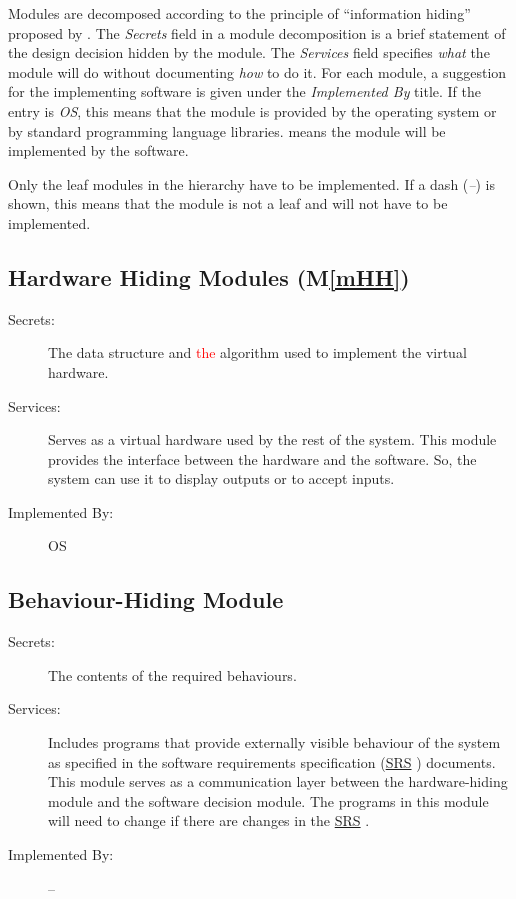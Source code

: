 \documentclass[12pt, titlepage]{article}
\newcommand{\mref}[1]{M\ref{#1}}
\begin{document}
Modules are decomposed according to the principle of ``information hiding''
proposed by \citet{ParnasEtAl1984}. The \emph{Secrets} field in a module
decomposition is a brief statement of the design decision hidden by the
module. The \emph{Services} field specifies \emph{what} the module will do
without documenting \emph{how} to do it. For each module, a suggestion for the
implementing software is given under the \emph{Implemented By} title. If the
entry is \emph{OS}, this means that the module is provided by the operating
system or by standard programming language libraries.  \emph{\progname{}} means the
module will be implemented by the \progname{} software.

Only the leaf modules in the hierarchy have to be implemented. If a dash
(\emph{--}) is shown, this means that the module is not a leaf and will not have
to be implemented.

\subsection{Hardware Hiding Modules (\mref{mHH})}

\begin{description}
\item[Secrets:]The data structure and \textcolor{red}{the} algorithm used to implement the virtual
  hardware.
\item[Services:]Serves as a virtual hardware used by the rest of the
  system. This module provides the interface between the hardware and the
  software. So, the system can use it to display outputs or to accept inputs.
\item[Implemented By:] OS
\end{description}

\subsection{Behaviour-Hiding Module}

\begin{description}
\item[Secrets:]The contents of the required behaviours.
\item[Services:]Includes programs that provide externally visible behaviour of
  the system as specified in the software requirements specification (\href{https://github.com/paezha/PyERT-BLACK/blob/main/docs/SRS/SRS.pdf}{SRS} \citep{SRS})
  documents. This module serves as a communication layer between the
  hardware-hiding module and the software decision module. The programs in this
  module will need to change if there are changes in the \href{https://github.com/paezha/PyERT-BLACK/blob/main/docs/SRS/SRS.pdf}{SRS} \citep{SRS}.
\item[Implemented By:] --
\end{description}
\end{document}
